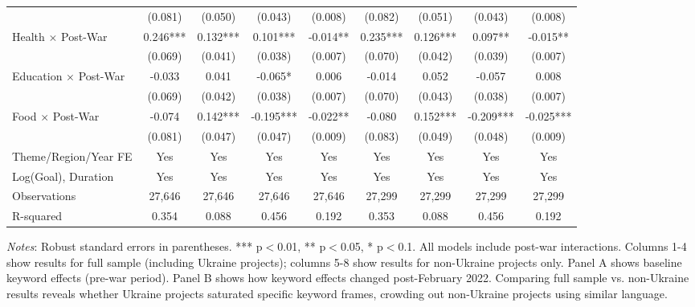\begin{table}[htbp]
\begin{threeparttable}
\begin{tabular}{lcccccccc}
& (0.081) & (0.050) & (0.043) & (0.008) & (0.082) & (0.051) & (0.043) & (0.008) \\
Health $\times$ Post-War & 0.246*** & 0.132*** & 0.101*** & -0.014** & 0.235*** & 0.126*** & 0.097** & -0.015** \\
& (0.069) & (0.041) & (0.038) & (0.007) & (0.070) & (0.042) & (0.039) & (0.007) \\
Education $\times$ Post-War & -0.033 & 0.041 & -0.065* & 0.006 & -0.014 & 0.052 & -0.057 & 0.008 \\
& (0.069) & (0.042) & (0.038) & (0.007) & (0.070) & (0.043) & (0.038) & (0.007) \\
Food $\times$ Post-War & -0.074 & 0.142*** & -0.195*** & -0.022** & -0.080 & 0.152*** & -0.209*** & -0.025*** \\
& (0.081) & (0.047) & (0.047) & (0.009) & (0.083) & (0.049) & (0.048) & (0.009) \\
\midrule
Theme/Region/Year FE & Yes & Yes & Yes & Yes & Yes & Yes & Yes & Yes \\
Log(Goal), Duration & Yes & Yes & Yes & Yes & Yes & Yes & Yes & Yes \\
\midrule
Observations & 27,646 & 27,646 & 27,646 & 27,646 & 27,299 & 27,299 & 27,299 & 27,299 \\
R-squared & 0.354 & 0.088 & 0.456 & 0.192 & 0.353 & 0.088 & 0.456 & 0.192 \\
\bottomrule
\end{tabular}
\begin{tablenotes}
\small
\item \textit{Notes}: Robust standard errors in parentheses. *** p$<$0.01, ** p$<$0.05, * p$<$0.1. All models include post-war interactions. Columns 1-4 show results for full sample (including Ukraine projects); columns 5-8 show results for non-Ukraine projects only. Panel A shows baseline keyword effects (pre-war period). Panel B shows how keyword effects changed post-February 2022. Comparing full sample vs. non-Ukraine results reveals whether Ukraine projects saturated specific keyword frames, crowding out non-Ukraine projects using similar language.
\end{tablenotes}
\end{threeparttable}
\end{table}

